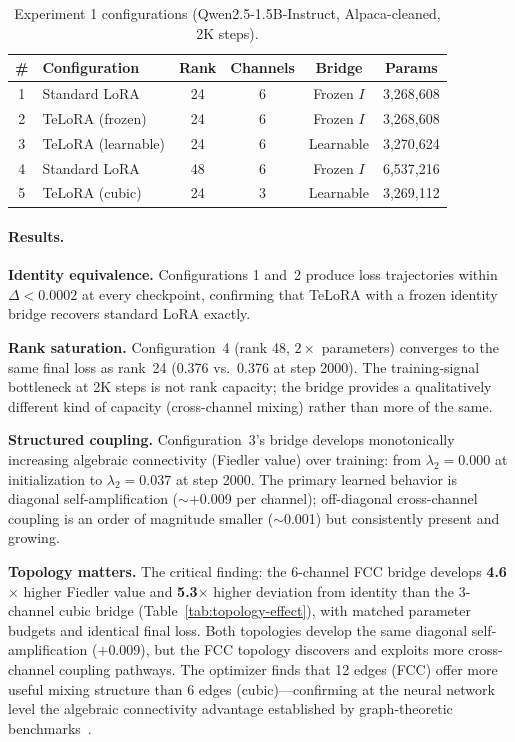 \begin{table}[t]
\centering
\caption{Experiment 1 configurations (Qwen2.5-1.5B-Instruct, Alpaca-cleaned, 2K steps).}
\label{tab:exp1-configs}
\small
\begin{tabular}{@{}clcccc@{}}
\toprule
\# & Configuration & Rank & Channels & Bridge & Params \\
\midrule
1 & Standard LoRA          & 24 & 6 & Frozen $I$ & 3,268,608 \\
2 & TeLoRA (frozen)    & 24 & 6 & Frozen $I$ & 3,268,608 \\
3 & TeLoRA (learnable) & 24 & 6 & Learnable  & 3,270,624 \\
4 & Standard LoRA          & 48 & 6 & Frozen $I$ & 6,537,216 \\
5 & TeLoRA (cubic)     & 24 & 3 & Learnable  & 3,269,112 \\
\bottomrule
\end{tabular}
\end{table}

\paragraph{Results.}
\textbf{Identity equivalence.} Configurations 1 and~2 produce loss
trajectories within $\Delta < 0.0002$ at every checkpoint, confirming that
TeLoRA with a frozen identity bridge recovers standard LoRA exactly.

\textbf{Rank saturation.} Configuration~4 (rank 48, $2\times$ parameters)
converges to the same final loss as rank~24 (0.376 vs.\ 0.376 at step
2000). The training-signal bottleneck at 2K steps is not rank capacity;
the bridge provides a qualitatively different kind of capacity
(cross-channel mixing) rather than more of the same.

\textbf{Structured coupling.} Configuration~3's bridge develops monotonically
increasing algebraic connectivity (Fiedler value) over training: from
$\lambda_2 = 0.000$ at initialization to $\lambda_2 = 0.037$ at step 2000.
The primary learned behavior is diagonal self-amplification ($\sim$$+$0.009
per channel); off-diagonal cross-channel coupling is an order of magnitude
smaller ($\sim$0.001) but consistently present and growing.

\textbf{Topology matters.} The critical finding: the 6-channel FCC bridge
develops \textbf{4.6$\times$} higher Fiedler value and \textbf{5.3$\times$}
higher deviation from identity than the 3-channel cubic bridge
(Table~\ref{tab:topology-effect}), with matched parameter budgets and
identical final loss. Both topologies develop the same diagonal
self-amplification ($+$0.009), but the FCC topology discovers and exploits
more cross-channel coupling pathways. The optimizer finds that 12 edges
(FCC) offer more useful mixing structure than 6 edges (cubic)---confirming
at the neural network level the algebraic connectivity advantage
established by graph-theoretic benchmarks~\cite{rhombilora_paper1}.

